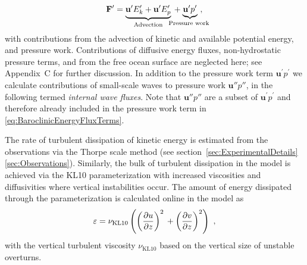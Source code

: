 \documentclass{ametsocV6.1}
\begin{document}
\begin{equation}
\mathbf{F'} = \underbrace{\mathbf{u^\prime}E'_k + \mathbf{u^\prime}E'_p}_\text{Advection} \\
   + \underbrace{\mathbf{u^\prime}p^\prime}_{\text{\makebox[0pt]{Pressure work} }}\ ,
\label{eq:BaroclinicEnergyFluxTerms}
\end{equation}
with contributions from the advection of kinetic and available potential energy, and pressure work.
Contributions of diffusive energy fluxes, non-hydrostatic pressure terms, and from the free ocean surface are neglected here; see Appendix~C for further discussion.
In addition to the pressure work term $\mathbf{u^\prime}p^\prime$ we calculate contributions of small-scale waves to pressure work $\mathbf{u''} p''$, in the following termed \emph{internal wave fluxes}.
Note that $\mathbf{u''} p''$ are a subset of $\mathbf{u^\prime}p^\prime$ and therefore already included in the pressure work term in \eqref{eq:BaroclinicEnergyFluxTerms}.

The rate of turbulent dissipation of kinetic energy is estimated from the observations via the Thorpe scale method (see section~\ref{sec:ExperimentalDetails}\ref{sec:Observations}).
Similarly, the bulk of turbulent dissipation in the model is achieved via the KL10 parameterization with increased viscosities and diffusivities where vertical instabilities occur.
The amount of energy dissipated through the parameterization is calculated online in the model as
\begin{equation}
\varepsilon = \nu_\mathrm{KL10} \left( \left( \frac{\partial u}{\partial z}\right)^2 \\
  + \left(\frac{\partial v}{\partial z}\right)^2\right)\ ,
\end{equation}
with the vertical turbulent viscosity $\nu_\mathrm{KL10}$ based on the vertical size of unstable overturns.
\end{document}
